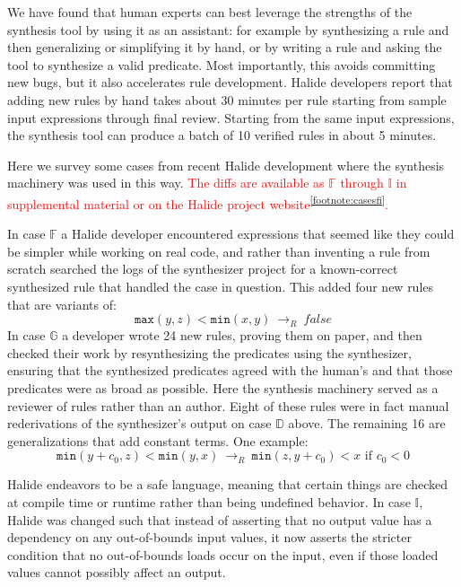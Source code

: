\documentclass[acmsmall,review]{acmart}\settopmatter{printfolios=true,printccs=false,printacmref=false}
\newcommand{\modified}[1]{\textcolor{red}{{#1}}}
\newcommand{\hmax}[0]{\texttt{max}}
\newcommand{\hmin}[0]{\texttt{min}}
\newcommand{\rewrites}[0]{\:\rightarrow_{R}\:}
\newcommand{\pred}[0]{\textrm{ if }}
\begin{document}

We have found that human experts can best leverage the strengths of the synthesis tool by using it as an assistant: for example by synthesizing a rule and then generalizing or simplifying it by hand, or by writing a rule and asking the tool to synthesize a valid predicate. Most importantly, this avoids committing new bugs, but it also accelerates rule development. Halide developers report that adding new rules by hand takes about 30 minutes per rule starting from sample input expressions through final review. Starting from the same input expressions, the synthesis tool can produce a batch of 10 verified rules in about 5 minutes.

Here we survey some cases from recent Halide development where the synthesis machinery was used in this way. \modified{The diffs are available as $\mathbb{F}$ through $\mathbb{I}$ in supplemental material or on the Halide project website\textsuperscript{\ref{footnote:casesfi}}.}

In case $\mathbb{F}$ a Halide developer encountered expressions that seemed like they could be simpler while working on real code, and rather than inventing a rule from scratch searched the logs of the synthesizer project for a known-correct synthesized rule that handled the case in question. This added four new rules that are variants of:
\[
\hmax(y, z) < \hmin(x, y) \rewrites \mathit{false}
\]
In case $\mathbb{G}$ a developer wrote 24 new rules, proving them on paper, and then checked their work by resynthesizing the predicates using the synthesizer, ensuring that the synthesized predicates agreed with the human’s and that those predicates were as broad as possible. Here the synthesis machinery served as a reviewer of rules rather than an author. Eight of these rules were in fact manual rederivations of the synthesizer’s output on case $\mathbb{D}$ above. The remaining 16 are generalizations that add constant terms. One example:
\[
\hmin(y + c_0, z) < \hmin(y, x) \rewrites \hmin(z, y + c_0) < x \pred c_0 < 0
\]

Halide endeavors to be a safe language, meaning that certain things are checked at compile time or runtime rather than being undefined behavior. In case $\mathbb{I}$, Halide was changed such that instead of asserting that no output value has a dependency on any out-of-bounds input values, it now asserts the stricter condition that no out-of-bounds loads occur on the input, even if those loaded values cannot possibly affect an output.
\end{document}
